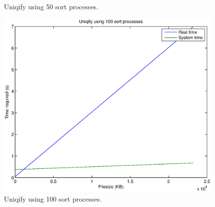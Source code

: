 \documentclass[letterpaper,10pt,titlepage]{article}
\begin{document}
\begin{enumerate}
\begin{figure}[H]
\begin{center}
	\end{center}
	\caption{Uniqify using 50 sort processes.}
\end{figure}
\begin{figure}[H]
	\begin{center}
	\includegraphics[width=8in]{figure3}
	\end{center}
	\caption{Uniqify using 100 sort processes.}
\end{figure}


\end{enumerate}
\end{document}
